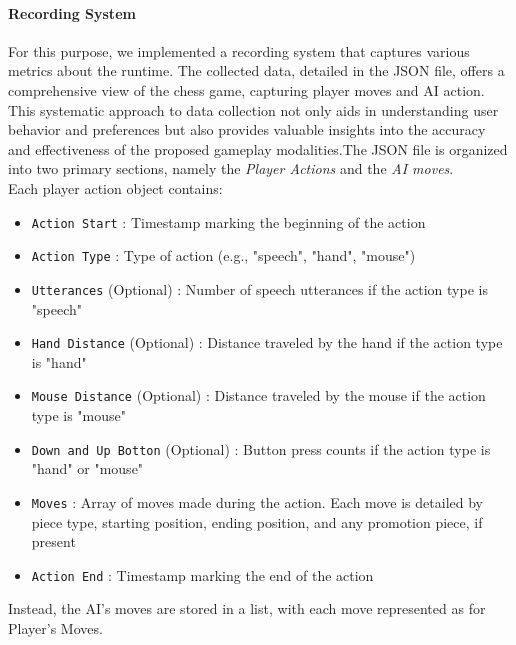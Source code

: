 \documentclass[a4paper, 11pt, twocolumn]{IEEEtran}
\begin{document}
    \paragraph*{Recording System} For this purpose, we implemented a recording system that captures various metrics about the runtime. The collected data, detailed in the JSON file, offers a comprehensive view of the chess game, capturing player moves and AI action. This systematic approach to data collection not only aids in understanding user behavior and preferences but also provides valuable insights into the accuracy and effectiveness of the proposed gameplay modalities.The JSON file is organized into two primary sections, namely the \emph{Player Actions} and the \emph{AI moves}. \\ Each player action object contains:
    \begin{itemize}
        \item \texttt{Action Start} : Timestamp marking the beginning of the action
        \item \texttt{Action Type} : Type of action (e.g., "speech", "hand", "mouse")
        \item \texttt{Utterances} (Optional) : Number of speech utterances if the action type is "speech"
        \item \texttt{Hand Distance} (Optional) : Distance traveled by the hand if the action type is "hand" 
        \item \texttt{Mouse Distance} (Optional) : Distance traveled by the mouse if the action type is "mouse"
        \item \texttt{Down and Up Botton} (Optional) : Button press counts if the action type is "hand" or "mouse"
        \item \texttt{Moves} : Array of moves made during the action. Each move is detailed by piece type, starting position, ending position, and any promotion piece, if present 
        \item \texttt{Action End} : Timestamp marking the end of the action    
    \end{itemize}
    Instead, the AI's moves are stored in a list, with each move represented as for Player's Moves.
\end{document}
